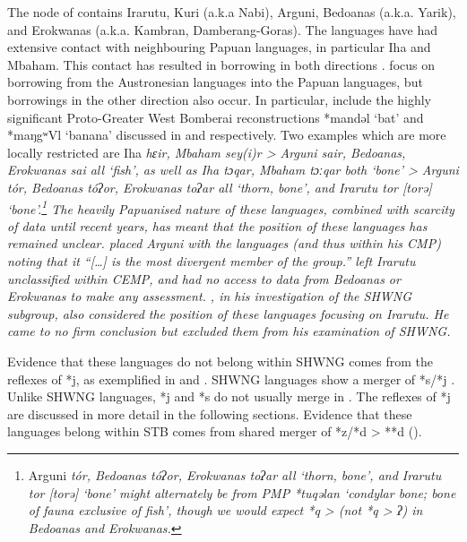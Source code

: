 The  node of  contains
Irarutu, Kuri (a.k.a Nabi), Arguni, Bedoanas (a.k.a.
Yarik), and Erokwanas (a.k.a. Kambran, Damberang-Goras).
The  languages have had extensive contact
with neighbouring Papuan languages,
in particular Iha and Mbaham.
This contact has resulted in borrowing in both directions
\citep{UsherSchapper2018,UsherSchapper2022}.
\citet{UsherSchapper2018} focus on borrowing from the Austronesian
languages into the Papuan languages,
but borrowings in the other direction also occur.
In particular, \citet{UsherSchapper2022} include the highly significant
Proto-Greater West Bomberai reconstructions *mandəl ‘bat’
and *maŋgʷVl ‘banana’ discussed in
 and  respectively.
Two examples which are more locally restricted are Iha \it{hɛir},
Mbaham \it{sey(i)r} > Arguni \it{sair},
Bedoanas, Erokwanas \it{sai} all ‘fish’,
as well as Iha \it{tɔqar},
Mbaham \it{tɔːqar} both ‘bone’ > Arguni \it{tór},
Bedoanas \it{tóʔor}, Erokwanas \it{toʔar} all ‘thorn,
bone’, and Irarutu \it{tor} [torə] ‘bone’.\footnote{
		Arguni \it{tór},
		Bedoanas \it{tóʔor}, Erokwanas \it{toʔar} all ‘thorn,
		bone’, and Irarutu \it{tor} [torə] ‘bone’ might alternately be
		from PMP *tuqəlan ‘condylar bone; bone of fauna exclusive of
		fish’, though we would expect *q > {\0} (not *q > \it{ʔ}) in Bedoanas
		and Erokwanas.} 
The heavily Papuanised nature of these languages,
combined with scarcity of data until recent years,
has meant that the position of these languages has remained unclear.
\citet[272]{Blust1993} placed Arguni with the 
languages (and thus within his CMP) noting that it “[{\ldots}]
is the most divergent member of the group.” \citet{Blust1993}
left Irarutu unclassified within CEMP,
and had no access to data from Bedoanas or Erokwanas to make any assessment.
\citet{Kamholz2014}, in his investigation of the SHWNG subgroup,
also considered the position of these languages focusing on Irarutu.
He came to no firm conclusion but excluded them from his examination of SHWNG.

\largerpage
Evidence that these languages do not belong within SHWNG comes
from the reflexes of *j,
as exemplified in  and .
SHWNG languages show a merger of *s/*j \citep[52f]{Kamholz2014}.
Unlike SHWNG languages, *j
and *s do not usually merge in .
The reflexes of *j are discussed in more detail in the following sections.
Evidence that these languages belong within STB comes from shared
merger of *z/*d > **d ().

